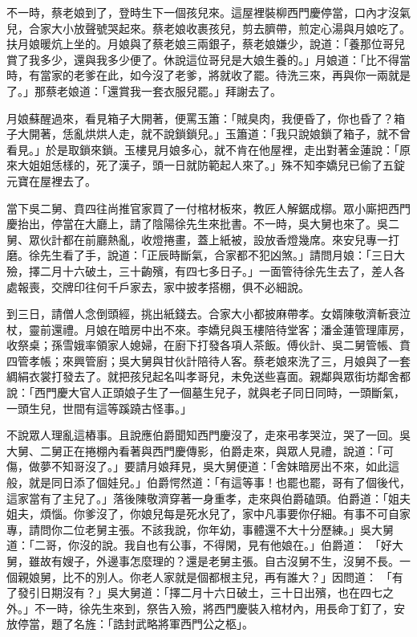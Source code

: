 不一時，蔡老娘到了，登時生下一個孩兒來。這屋裡裝柳西門慶停當，口內才沒氣兒，合家大小放聲號哭起來。蔡老娘收裹孩兒，剪去臍帶，煎定心湯與月娘吃了。扶月娘暖炕上坐的。月娘與了蔡老娘三兩銀子，蔡老娘嫌少，說道：「養那位哥兒賞了我多少，還與我多少便了。休說這位哥兒是大娘生養的。」月娘道：「比不得當時，有當家的老爹在此，如今沒了老爹，將就收了罷。待洗三來，再與你一兩就是了。」那蔡老娘道：「還賞我一套衣服兒罷。」拜謝去了。

月娘蘇醒過來，看見箱子大開著，便罵玉簫：「賊臭肉，我便昏了，你也昏了？箱子大開著，恁亂烘烘人走，就不說鎖鎖兒。」玉簫道：「我只說娘鎖了箱子，就不曾看見。」於是取鎖來鎖。玉樓見月娘多心，就不肯在他屋裡，走出對著金蓮說：「原來大姐姐恁樣的，死了漢子，頭一日就防範起人來了。」殊不知李嬌兒已偷了五錠元寶在屋裡去了。

當下吳二舅、賁四往尚推官家買了一付棺材板來，教匠人解鋸成槨。眾小廝把西門慶抬出，停當在大廳上，請了陰陽徐先生來批書。不一時，吳大舅也來了。吳二舅、眾伙計都在前廳熱亂，收燈捲畫，蓋上紙被，設放香燈幾席。來安兒專一打磨。徐先生看了手，說道：「正辰時斷氣，合家都不犯凶煞。」請問月娘：「三日大殮，擇二月十六破土，三十齣殯，有四七多日子。」一面管待徐先生去了，差人各處報喪，交牌印往何千戶家去，家中披孝搭棚，俱不必細說。

到三日，請僧人念倒頭經，挑出紙錢去。合家大小都披麻帶孝。女婿陳敬濟斬衰泣杖，靈前還禮。月娘在暗房中出不來。李嬌兒與玉樓陪待堂客；潘金蓮管理庫房，收祭桌；孫雪娥率領家人媳婦，在廚下打發各項人茶飯。傅伙計、吳二舅管帳、賁四管孝帳；來興管廚；吳大舅與甘伙計陪待人客。蔡老娘來洗了三，月娘與了一套綢絹衣裳打發去了。就把孩兒起名叫孝哥兒，未免送些喜面。親鄰與眾街坊鄰舍都說：「西門慶大官人正頭娘子生了一個墓生兒子，就與老子同日同時，一頭斷氣，一頭生兒，世間有這等蹊蹺古怪事。」

不說眾人理亂這樁事。且說應伯爵聞知西門慶沒了，走來弔孝哭泣，哭了一回。吳大舅、二舅正在捲棚內看著與西門慶傳影，伯爵走來，與眾人見禮，說道：「可傷，做夢不知哥沒了。」要請月娘拜見，吳大舅便道：「舍妹暗房出不來，如此這般，就是同日添了個娃兒。」伯爵愕然道：「有這等事！也罷也罷，哥有了個後代，這家當有了主兒了。」落後陳敬濟穿著一身重孝，走來與伯爵磕頭。伯爵道：「姐夫姐夫，煩惱。你爹沒了，你娘兒每是死水兒了，家中凡事要你仔細。有事不可自家專，請問你二位老舅主張。不該我說，你年幼，事體還不大十分歷練。」吳大舅道：「二哥，你沒的說。我自也有公事，不得閑，見有他娘在。」伯爵道： 「好大舅，雖故有嫂子，外邊事怎麼理的？還是老舅主張。自古沒舅不生，沒舅不長。一個親娘舅，比不的別人。你老人家就是個都根主兒，再有誰大？」因問道： 「有了發引日期沒有？」吳大舅道：「擇二月十六日破土，三十日出殯，也在四七之外。」不一時，徐先生來到，祭告入殮，將西門慶裝入棺材內，用長命丁釘了，安放停當，題了名旌：「誥封武略將軍西門公之柩」。

